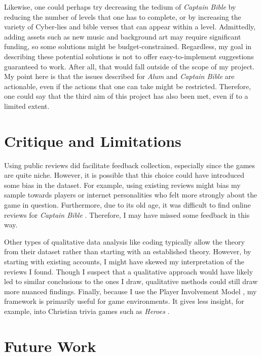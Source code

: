 Likewise, one could perhaps try decreasing the tedium of \textit{Captain Bible} \parencite{engelbrite_captain_1994} by reducing the number of levels that one has to complete, or by increasing the variety of Cyber-lies and bible verses that can appear within a level. Admittedly, adding assets such as new music and background art may require significant funding, so some solutions might be budget-constrained. Regardless, my goal in describing these potential solutions is not to offer easy-to-implement suggestions guaranteed to work. After all, that would fall outside of the scope of my project. My point here is that the issues described for \textit{Alum} \parencite{orsie_alum_2006} and \textit{Captain Bible} are actionable, even if the actions that one can take might be restricted. Therefore, one could say that the third aim of this project has also been met, even if to a limited extent.

\section{Critique and Limitations}
Using public reviews did facilitate feedback collection, especially since the games are quite niche. However, it is possible that this choice could have introduced some bias in the dataset. For example, using existing reviews might bias my sample towards players or internet personalities who felt more strongly about the game in question. Furthermore, due to its old age, it was difficult to find online reviews for \textit{Captain Bible} \parencite{engelbrite_captain_1994}. Therefore, I may have missed some feedback in this way.

Other types of qualitative data analysis like coding typically allow the theory from their dataset rather than starting with an established theory. However, by starting with existing accounts, I might have skewed my interpretation of the reviews I found. Though I suspect that a qualitative approach would have likely led to similar conclusions to the ones I draw, qualitative methods could still draw more nuanced findings. Finally, because I use the Player Involvement Model \parencite{calleja_in_game_2011}, my framework is primarily useful for game environments. It gives less insight, for example, into Christian trivia games such as \textit{Heroes} \parencite{neves_heroes_2021}.

\section{Future Work}

